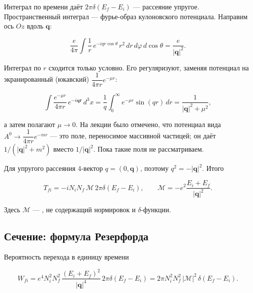 \documentclass[../final.tex]{subfiles}
\begin{document}
Интеграл по времени даёт $2\pi\delta(E_f-E_i)$ ---
рассеяние упругое. Пространственный интеграл --- фурье-образ
кулоновского потенциала. Направим ось $Oz$ вдоль $\mathbf q$:

\begin{equation*}
    \frac{e}{4\pi}
    \int\frac{1}{r}\,
    e^{-iqr\cos\theta}\,
    r^2\,dr\,d\varphi\,d\cos\theta
    =
    \frac{e}{|\mathbf q|^2}.
\end{equation*}

Интеграл по $r$ сходится только условно. Его регуляризуют,
заменяя потенциал на экранированный (юкавский)
$\dfrac{1}{4\pi r}e^{-\mu r}$:

\begin{equation*}
    \int\frac{e^{-\mu r}}{4\pi r}\,e^{-i\mathbf q\mathbf r}\,d^3x
    =
    \frac{1}{q}\int_0^\infty e^{-\mu r}\sin(qr)\,dr
    =
    \frac{1}{|\mathbf q|^2+\mu^2},
\end{equation*}

а затем полагают $\mu\to0$. На лекции было отмечено, что
потенциал вида
$A^0\to\dfrac{1}{4\pi r}e^{-mr}$ 
--- это поле, переносимое массивной частицей; он даёт
$1/(|\mathbf q|^2+m^2)$ вместо $1/|\mathbf q|^2$.
Пока такие поля не рассматриваем.

Для упругого рассеяния 4-вектор $q=(0,\mathbf q)$, поэтому
$q^2=-|\mathbf q|^2$. Итого

\begin{equation*}
    T_{fi}
    =
    -iN_iN_f\,\mathcal M\,2\pi\delta(E_f-E_i),
    \qquad
    \mathcal M
    =
    -e^2\frac{E_i+E_f}{|\mathbf q|^2}.
\end{equation*}

Здесь $\mathcal M$ --- ,
не содержащий нормировок и $\delta$-функции.


\subsection{Сечение: формула Резерфорда}

Вероятность перехода в единицу времени

\begin{equation*}
    W_{fi}
    =
    e^4N_i^2N_f^2\,
    \frac{\left(E_i+E_f\right)^2}{|\mathbf q|^4}\,
    2\pi\delta(E_f-E_i)
    =
    2\pi N_i^2N_f^2\,|\mathcal M|^2\,\delta(E_f-E_i).
\end{equation*}
\end{document}
